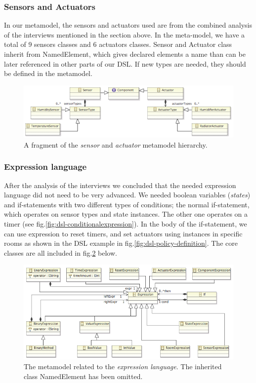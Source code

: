 \subsubsection{Sensors and Actuators}
In our metamodel, the sensors and actuators used are from the combined analysis of the interviews mentioned in the section above. In the meta-model, we have a total of 9 sensors classes and 6 actuators classes. Sensor and Actuator class inherit from NamedElement, which gives declared elements a name than can be later referenced in other parts of our DSL. If new types are needed, they should be defined in the metamodel.

\begin{figure}[h]
	\centering
    \includegraphics[scale=.7]{ecore-sensors-actuators.png} 
	\caption{A fragment of the \textit{sensor} and \textit{actuator} metamodel hierarchy.}
	\label{fig:ecore-sensors-actuators}
\end{figure}


\subsubsection{Expression language}
After the analysis of the interviews we concluded that the needed expression language did not need to be very advanced. We needed boolean variables (\textit{states}) and if-statements with two different types of conditions; the normal if-statement, which operates on sensor types and state instances. The other one operates on a timer (see fig.\ref{fig:dsl-conditionalexpression}). In the body of the if-statement, we can use expression to reset timers, and set actuators using instances in specific rooms as shown in the DSL example in fig.\ref{fig:dsl-policy-definition}. The core classes are all included in fig.\ref{fig:ecore-expression-language} below.

\begin{figure}[h]
  \centering
    \includegraphics[scale=.5]{ecore-expression-language.png} 
	\caption{The metamodel related to the \textit{expression language}. The inherited class NamedElement has been omitted.}
	\label{fig:ecore-expression-language}
\end{figure}


